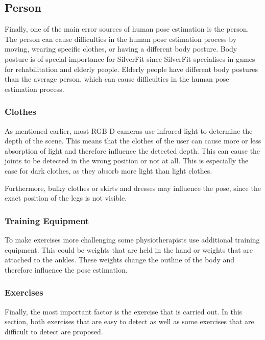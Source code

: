 \subsection{Person}

Finally, one of the main error sources of human pose estimation is the person. The person can cause difficulties in the human pose estimation process by moving, wearing specific clothes, or having a different body posture. Body posture is of special importance for SilverFit since SilverFit specialises in games for rehabilitation and elderly people. Elderly people have different body postures than the average person, which can cause difficulties in the human pose estimation process.

\subsubsection{Clothes}

As mentioned earlier, most RGB-D cameras use infrared light to determine the depth of the scene. This means that the clothes of the user can cause more or less absorption of light and therefore influence the detected depth. This can cause the joints to be detected in the wrong position or not at all. This is especially the case for dark clothes, as they absorb more light than light clothes.

Furthermore, bulky clothes or skirts and dresses may influence the pose, since the exact position of the legs is not visible.

\subsubsection{Training Equipment}

To make exercises more challenging some physiotherapists use additional training equipment. This could be weights that are held in the hand or weights that are attached to the ankles. These weights change the outline of the body and therefore influence the pose estimation. 

\subsubsection{Exercises}
\label{sec:exercises}

Finally, the most important factor is the exercise that is carried out. In this section, both exercises that are easy to detect as well as some exercises that are difficult to detect are proposed.

